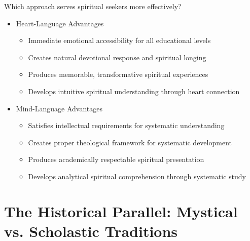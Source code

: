 \documentclass[11pt,twoside]{book}
\begin{document}
Which approach serves spiritual seekers more effectively?
\begin{itemize}
\item Heart-Language Advantages
\label{sec:org17f9ee0}
\begin{itemize}
\item Immediate emotional accessibility for all educational levels
\item Creates natural devotional response and spiritual longing
\item Produces memorable, transformative spiritual experiences
\item Develops intuitive spiritual understanding through heart connection
\end{itemize}
\item Mind-Language Advantages
\label{sec:org02d8d07}
\begin{itemize}
\item Satisfies intellectual requirements for systematic understanding
\item Creates proper theological framework for systematic development
\item Produces academically respectable spiritual presentation
\item Develops analytical spiritual comprehension through systematic study
\end{itemize}
\end{itemize}
\section*{The Historical Parallel: Mystical vs. Scholastic Traditions}
\label{sec:org1d1ede3}
\end{document}
